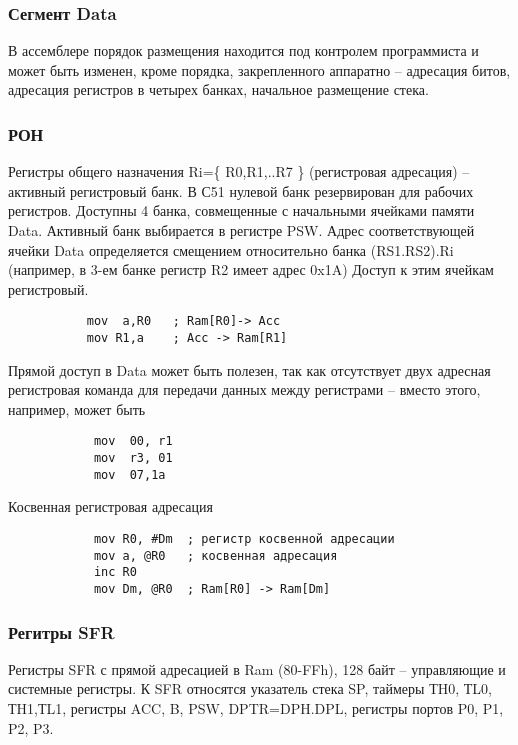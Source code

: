 \documentclass[12pt, a4paper] {ncc}
\begin{document}
        \subsubsection{Сегмент Data}
        В ассемблере порядок размещения находится под контролем программиста и может быть изменен, кроме порядка,
        закрепленного аппаратно – адресация битов, адресация регистров в четырех банках, начальное размещение стека.

        \subsubsection{РОН}
        Регистры общего назначения Ri=\{ R0,R1,..R7 \} (регистровая адресация) – активный регистровый банк. В С51
        нулевой банк резервирован для  рабочих регистров. Доступны 4 банка, совмещенные с начальными ячейками
        памяти Data. Активный банк выбирается в регистре PSW. Адрес соответствующей ячейки Data определяется
        смещением относительно банка (RS1.RS2).Ri (например, в 3-ем банке регистр R2 имеет адрес 0x1A)
        Доступ к этим ячейкам регистровый.
        \begin{verbatim}
           mov  a,R0   ; Ram[R0]-> Аcc
           mov R1,a    ; Аcc -> Ram[R1]
        \end{verbatim}
        Прямой доступ в Data может быть полезен, так как отсутствует двух адресная регистровая команда для
        передачи данных между регистрами – вместо этого, например, может быть
        \begin{verbatim}
            mov  00, r1
            mov  r3, 01
            mov  07,1a
        \end{verbatim}
        Косвенная  регистровая адресация
        \begin{verbatim}
            mov R0, #Dm  ; регистр косвенной адресации
            mov a, @R0   ; косвенная адресация
            inc R0
            mov Dm, @R0  ; Ram[R0] -> Ram[Dm]
        \end{verbatim}

        \subsubsection{Регитры SFR}
            Регистры SFR с прямой адресацией в Ram (80-FFh), 128 байт – управляющие и системные регистры.
            К SFR относятся указатель стека SP, таймеры ТH0, ТL0, ТH1,ТL1, регистры ACC, B, PSW, DPTR=DPH.DPL,
            регистры портов P0, P1, P2, P3.
\end{document}
